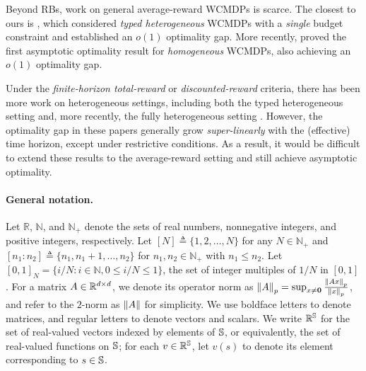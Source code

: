 \documentclass[11pt,letterpaper]{article}
\begin{document}
Beyond RBs, work on general average-reward WCMDPs is scarce.
The closest to ours is \citep{Ver_16_verloop}, which considered \emph{typed heterogeneous} WCMDPs with a \emph{single} budget constraint and established an $o(1)$ optimality gap.
More recently, \citep{GolAvr_24_wcmdp_multichain} proved the first asymptotic optimality result for \emph{homogeneous} WCMDPs, also achieving an $o(1)$ optimality gap. 


Under the \emph{finite-horizon total-reward} or \emph{discounted-reward} criteria, there has been more work on heterogeneous settings, including both the typed heterogeneous setting \citep{DaeChoGri_23,GhoNagJaiTam_23_finite_discount} and, more recently, the fully heterogeneous setting \citep{BroSmi_19_rb,BroZha_22,BroZha_23,Zhang24_het}.
However, the optimality gap in these papers generally grow \emph{super-linearly} with the (effective) time horizon, except under restrictive conditions.
As a result, it would be difficult to extend these results to the average-reward setting and still achieve asymptotic optimality.


\paragraph{General notation.}
Let $\mathbb{R}$, $\mathbb{N}$, and $\mathbb{N}_+$ denote the sets of real numbers, nonnegative integers, and positive integers, respectively.
Let $[N]\triangleq\{1,2,\dots,N\}$ for any $N\in \mathbb{N}_+$ and $[n_1:n_2]\triangleq\{n_1,n_1+1,\dots,n_2\}$ for $n_1,n_2\in\mathbb{N}_+$ with $n_1\le n_2$.
Let $[0,1]_N=\{i/N\colon i\in\mathbb{N}, 0\le i/N\le 1\}$, the set of integer multiples of $1/N$ in $[0,1]$.
For a matrix ${A}\in\mathbb{R}^{d\times d}$, we denote its operator norm as $\left\lVert{A}\right\rVert_p=\sup_{x\neq \mathbf{0}}\frac{\left\lVert{A}x\right\rVert_{p}}{\left\lVert x\right\rVert_p}$, and refer to the $2$-norm as $\left\lVert A\right\rVert$ for simplicity.
We use boldface letters to denote matrices, and regular letters to denote vectors and scalars. We write $\mathbb{R}^{\mathbb{S}}$ for the set of real-valued vectors indexed by elements of $\mathbb{S}$, or equivalently, the set of real-valued functions on $\mathbb{S}$; for each $v\in \mathbb{R}^{\mathbb{S}}$, let $v(s)$ to denote its element corresponding to $s\in\mathbb{S}$. 
\end{document}
